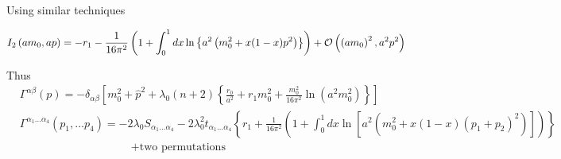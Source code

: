 Using similar techniques

\begin{equation}
I_{2}\left(a m_{0}, a p\right)=-r_{1}-\frac{1}{16\pi^{2}}\left(1+\int_{0}^{1} d x \ln \left\{a^{2}\left(m_0^{2}+x(1-x) p^{2}\right)\right\}\right)+{\cal O}\left(\left(a m_{0}\right)^{2}, a^{2} p^{2}\right)
\end{equation}

Thus
%
\begin{equation}
\begin{aligned}
&  \Gamma^{\alpha \beta}(p)=-\delta_{\alpha \beta}\left[m_{0}^{2}+\hat p^{2}+\lambda_{0}(n+2)\left\{\frac{r_{0}}{a^{2}}+r_{1} m_{0}^{2}+\frac{m_{0}^{2}}{16 \pi^{2}} \ln \left(a^{2} m_{0}^{2}\right)\right\}\right] \\
& \Gamma^{\alpha_{1} \ldots \alpha_{4}}\left(p_1, \ldots p_{4}\right)=-2 \lambda_{0} S_{\alpha_{1} \ldots \alpha_{4}}-2 \lambda_{0}^{2} t_{\alpha_{1} \ldots \alpha_{4}}\left\{r_{1}+\frac{1}{16 \pi^{2}}\left(1+\int_{0}^{1} d x \ln \left[a^{2}\left(m_{0}^{2}+x(1-x)\left(p_{1}+p_{2}\right)^{2}\right)\right]\right)\right\}\\
& \qquad \qquad \qquad \qquad \qquad+ \text{two permutations}
\end{aligned}
\end{equation}


